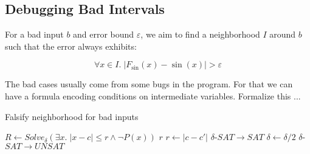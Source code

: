 \subsection{Debugging Bad Intervals}

For a bad input $b$ and error bound $\varepsilon$, we aim to find a
neighborhood $I$ around $b$ such that the error always exhibits:

$$ \forall x\in I.\; |F_{\sin}(x) - \sin(x)| > \varepsilon$$

The bad cases usually come from some bugs in the program. For that we
can have a formula encoding conditions on intermediate variables.
Formalize this ...

\begin{algorithm}
  \centering
  \caption{Falsify neighborhood for bad inputs}
  \begin{algorithmic}[1]
            \State $R \gets Solve_{\delta}(\exists x. \; |x - c| \le r \land \neg P(x))$
                \State \Return $r$
                    \State $r \gets |c - c'|$
                    \Comment $\delta$-$SAT \to SAT$
                \Else
                    \State $\delta \gets \delta / 2$
                    \Comment $\delta$-$SAT \to UNSAT$
                \EndIf
            \EndIf
        \EndWhile
    \EndProcedure
  \end{algorithmic}
\end{algorithm}

